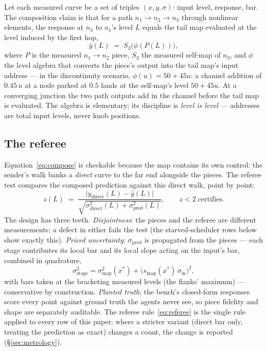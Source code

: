 \documentclass[11pt,a4paper]{article}
\begin{document}
Let each measured curve be a set of triples $(x, y, \sigma)$: input
level, response, bar. The composition claim is that for a path
$n_1 \to n_2 \to n_3$ through nonlinear elements, the response at
$n_3$ to $n_1$'s level $L$ equals the tail map evaluated at the level
induced by the first hop,
\begin{equation}
\hat{y}(L) \;=\; S_3\bigl(\phi(P(L))\bigr),
\label{eq:compose}
\end{equation}
where $P$ is the measured $n_1{\to}n_2$ piece, $S_3$ the measured
self-map of $n_3$, and $\phi$ the level algebra that converts the
piece's output into the tail map's input address --- in the
discontinuity scenario, $\phi(u) = 50 + 45u$: a channel addition of
$0.45\,u$ at a node parked at $0.5$ lands at the self-map's level
$50 + 45u$. At a converging junction the two path outputs add in the
channel before the tail map is evaluated. The algebra is elementary;
its discipline is \emph{level is level} --- addresses are total input
levels, never knob positions.

\subsection{The referee}

Equation~\eqref{eq:compose} is checkable because the map contains its
own control: the sender's walk banks a \emph{direct} curve to the far
end alongside the pieces. The referee test compares the composed
prediction against this direct walk, point by point:
\begin{equation}
z(L) \;=\; \frac{\lvert y_{\text{direct}}(L) - \hat{y}(L)\rvert}
{\sqrt{\sigma_{\text{direct}}^2(L) + \sigma_{\text{pred}}^2(L)}},
\qquad z < 2 \;\text{certifies.}
\label{eq:referee}
\end{equation}
The design has three teeth. \emph{Disjointness}: the pieces and the
referee are different measurements; a defect in either fails the test
(the starved-scheduler rows below show exactly this). \emph{Priced
uncertainty}: $\sigma_{\text{pred}}$ is propagated from the pieces ---
each stage contributes its local bar and its local slope acting on the
input's bar, combined in quadrature,
\begin{equation}
\sigma_{\text{stage}}^2 = \sigma_{\text{map}}^2(x^\ast) +
\bigl(s_{\text{map}}(x^\ast)\,\sigma_{\text{in}}\bigr)^{2},
\label{eq:prop}
\end{equation}
with bars taken at the bracketing measured levels (the flanks'
maximum) --- conservative by construction. \emph{Planted truth}: the
bench's closed-form responses score every point against ground truth
the agents never see, so piece fidelity and shape are separately
auditable. The referee rule~\eqref{eq:referee} is the single rule
applied to every row of this paper; where a stricter variant (direct
bar only, treating the prediction as exact) changes a count, the
change is reported (\S\ref{sec:metrology}).
\end{document}
